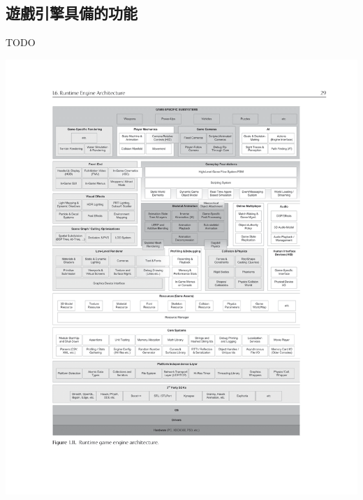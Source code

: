 \subsection{遊戲引擎具備的功能}

TODO

\includegraphics[width=\textwidth]{./resources/engine_arch.png}

\newpage